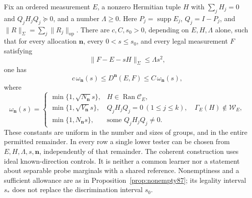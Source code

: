 \begin{theorem}\label{thm:allocation88}
Fix an ordered measurement $E$, a nonzero Hermitian tuple $H$ with
$\sum_jH_j=0$ and $Q_jH_jQ_j\succeq0$, and a number $\Lambda\ge0$.
Here $P_j=\operatorname{supp}E_j$, $Q_j=I-P_j$, and
$\|R\|_\Sigma=\sum_j\|R_j\|_{\mathrm{op}}$.
There are $c,C,s_0>0$, depending on $E,H,\Lambda$ alone, such that
for every allocation $\boldsymbol n$, every $0<s\le s_0$, and every
legal measurement $F$ satisfying
\begin{equation}\label{eq:allocationtube88}
 \|F-E-sH\|_\Sigma\le\Lambda s^2,
\end{equation}
one has
\begin{equation}\label{eq:allocationlaw88}
 c\,\omega_{\boldsymbol n}(s)
 \le D^{\boldsymbol n}(E,F)
 \le C\,\omega_{\boldsymbol n}(s),
\end{equation}
where
\[
 \omega_{\boldsymbol n}(s)=
 \begin{cases}
 \min\{1,\sqrt{N_{\boldsymbol n}}s\},
                    &H\in\operatorname{Ran}\mathcal C_E,\\
 \min\{1,\sqrt{V_{\boldsymbol n}}s\},
                    &Q_jH_jQ_j=0\ (1\le j\le k),\quad
                           \Gamma_E(H)\notin\mathcal W_E,\\
 \min\{1,N_{\boldsymbol n}s\},&\text{some }Q_jH_jQ_j\ne0.
 \end{cases}
\]
These constants are uniform in the number and sizes of groups, and
in the entire permitted remainder.  In every row a single lower
tester can be chosen from $E,H,\Lambda,s,\boldsymbol n$, independently
of that remainder.  The coherent construction uses ideal
known-direction controls.  It is neither a common learner nor a
statement about separable probe marginals with a shared reference.
Nonemptiness and a sufficient allowance are as in
Proposition~\ref{prop:nonempty87}; its legality interval $s_*$ does
not replace the discrimination interval $s_0$.
\end{theorem}
